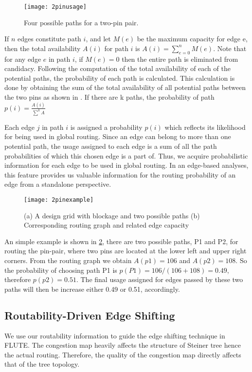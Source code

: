 \begin{itemize}
\begin{figure}[tbh!]
    \centering
    \texttt{[image: 2pinusage]}
    \caption{Four possible paths for a two-pin pair.}
    \label{fig:2pinusage}
\end{figure}

If $n$ edges constitute path $i$, and let $M(e)$ be the maximum capacity for edge e, then the total availability $A(i)$ for path $i$ is $A(i)=\sum_{e=0}^{n}M(e)$. Note that for any edge $e$ in path $i$, if $M(e)=0$ then the entire path is eliminated from candidacy. Following the computation of the total availability of each of the potential paths, the probability of each path is calculated. This calculation is done by obtaining the sum of the total availability of all potential paths between the two pins as shown in .
If there are k paths, the probability of path $p(i)=\frac{A(i)}{\sum^{k}A}$

Each edge $j$ in path $i$ is assigned a probability $p(i)$ which reflects its likelihood for being used in global routing. Since an edge can belong to more than one potential path, the usage assigned to each edge is a sum of all the path probabilities of which this chosen edge is a part of. Thus, we acquire probabilistic information for each edge to be used in global routing. In an edge-based analyses, this feature provides us valuable information for the routing probability of an edge from a standalone perspective.

\begin{figure}[htbp]
    \centerline{\texttt{[image: 2pinexample]}}
    \caption{(a) A design grid with blockage and two possible paths (b) Corresponding routing graph and related edge capacity}
    \label{fig:2pinexample}
\end{figure}
An simple example is shown in \cref{fig:2pinexample}, there are two possible paths, P1 and P2, for routing the pin-pair, where two pins are located at the lower left and upper right corners. From the routing graph we obtain $A(p1)=106$ and $A(p2)=108$. So the probability of choosing path P1 is $p(P1)=106/(106+108)=0.49$, therefore $p(p2)=0.51$. The final usage assigned for edges passed by these two paths will then be increase either 0.49 or 0.51, accordingly.
\end{itemize}

\subsection{Routability-Driven Edge Shifting}
We use our routability information to guide the edge shifting technique in FLUTE\cite{fastroute}. The congestion map heavily affects the structure of Steiner tree hence the actual routing. Therefore, the quality of the congestion map directly affects that of the tree topology.

